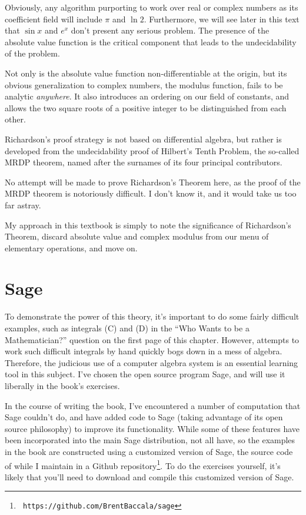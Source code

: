 \vfill\eject

Obviously, any algorithm purporting to work over real or complex numbers as its coefficient
field will include $\pi$ and $\ln 2$.  Furthermore, we will see later in this text that
$\sin x$ and $e^x$ don't present any serious problem.  The presence of the absolute
value function is the critical component that leads to the undecidability of the problem.

Not only is the absolute value function non-differentiable at the origin, but its
obvious generalization to complex numbers, the modulus function, fails to be
analytic {\it anywhere}.  It also introduces an ordering on our field of constants,
and allows the two square roots of a positive integer to be distinguished from
each other.

Richardson's proof strategy is not based on differential algebra, but rather is
developed from the undecidability proof of Hilbert's Tenth Problem, the so-called
MRDP theorem, named after the surnames of its four principal contributors.

No attempt will be made to prove Richardson's Theorem here, as the proof of the MRDP theorem
is notoriously difficult.  I don't know it, and it would take us too far astray.

My approach in this textbook is simply to note the significance of Richardson's
Theorem, discard absolute value and complex modulus from our menu of elementary
operations, and move on.

\vfill\eject
\section{Sage}

To demonstrate the power of this theory, it's important to do some
fairly difficult examples, such as integrals (C) and (D) in the ``Who
Wants to be a Mathematician?'' question on the first page of this
chapter.  However, attempts to work such difficult integrals by hand
quickly bogs down in a mess of algebra.  Therefore, the judicious use
of a computer algebra system is an essential learning tool in this
subject.  I've chosen the open source program Sage, and will use it
liberally in the book's exercises.

In the course of writing the book, I've encountered a number of
computation that Sage couldn't do, and have added code to Sage (taking
advantage of its open source philosophy) to improve its functionality.
While some of these features have been incorporated into the main Sage
distribution, not all have, so the examples in the book are
constructed using a customized version of Sage, the source code of
while I maintain in a Github repository\footnote{\tt
https://github.com/BrentBaccala/sage}.  To do the exercises yourself,
it's likely that you'll need to download and compile this customized
version of Sage.

